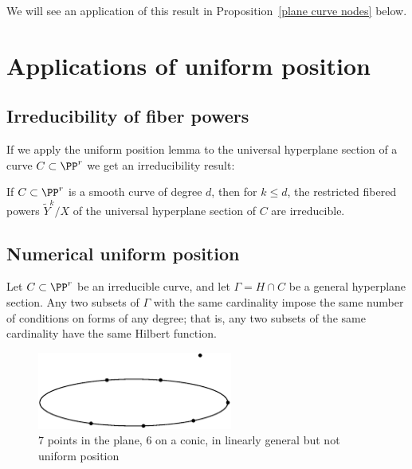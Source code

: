We will see an application of this result in Proposition~\ref{plane curve nodes} below.

 \section{Applications of uniform position}
\subsection{Irreducibility of fiber powers}
If we apply the uniform position lemma to the universal hyperplane section of a curve $C \subset \PP^r$ we get an irreducibility result:

\begin{corollary}\label{hyperplane section monodromy} If $C\subset \PP^r$ is a smooth curve of degree $d$, then 
for $k\leq d$, the restricted fibered powers $\tilde Y^k/X$  of the universal hyperplane section 
of $C$ are irreducible.
\end{corollary}

\subsection{Numerical uniform position}
\begin{corollary}\label{numerical uniform position lemma}
Let $C\subset \PP^r$ be an irreducible curve, and let $\Gamma = H\cap C$ be a general hyperplane section. Any two subsets of $\Gamma$ with the same cardinality impose the same number of conditions on forms of any degree; that is, any two subsets of the same cardinality have the same Hilbert function.
\end{corollary}


\begin{figure}
\centerline {\includegraphics[height=1in]{"main/Fig10-2"}}
\caption{7 points in the plane, 6 on a conic, in linearly general but not uniform position}
\label{default}
\end{figure}


